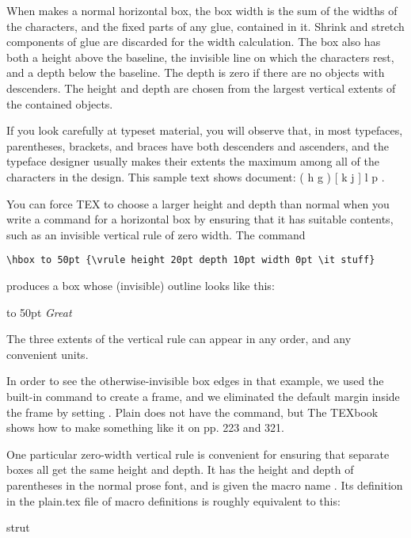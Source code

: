 {

When \tex makes a normal horizontal box, the box width is the sum
of the widths of the characters, and the fixed parts of any glue, contained
in it. Shrink and stretch components of glue are discarded for the width
calculation. The box also has both a height above the baseline, the invisible
line on which the characters rest, and a depth below the baseline. The
depth is zero if there are no objects with descenders. The height and depth
are chosen from the largest vertical extents of the contained objects.

If you look carefully at typeset material, you will observe that, in most
typefaces, parentheses, brackets, and braces have both descenders and ascenders,
and the typeface designer usually makes their extents the maximum
among all of the characters in the design. This sample text shows
document: ( h g ) [ k j ] { l p }.

You can force TEX to choose a larger height and depth than normal when
you write a command for a horizontal box by ensuring that it has suitable
contents, such as an invisible vertical rule of zero width. The command

\verb+\hbox to 50pt {\vrule height 20pt depth 10pt width 0pt \it stuff}+

produces a box whose (invisible) outline looks like this: 

\hbox to 50pt {\vrule height 20pt depth 10pt width 0pt \it Great}


The
three extents of the vertical rule can appear in any order, and any convenient
units.

In order to see the otherwise-invisible box edges in that example, we
used the \latex  built-in command  to create a frame, and we eliminated
the default margin inside the frame by setting . Plain \tex
does not have the  command, but The TEXbook shows how to make
something like it on pp. 223 and 321.

One particular zero-width vertical rule is convenient for ensuring that
separate boxes all get the same height and depth. It has the height and
depth of parentheses in the normal prose font, and is given the macro name .
Its definition in the plain.tex file of macro definitions is roughly
equivalent to this:

\begin{docCommand}{strut}{}
\end{docCommand}

}
